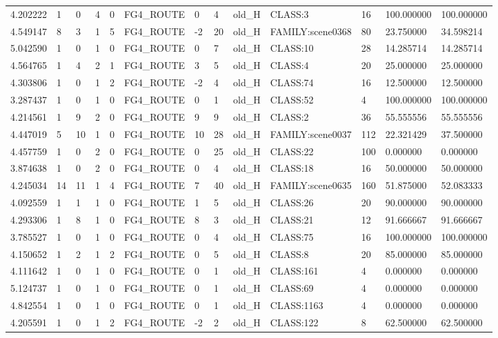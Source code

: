 \begin{tabular}{lllllllllllll}
4.202222 & 1 & 0 & 4 & 0 & FG4\_ROUTE & 0 & 4 & old\_H & CLASS:3 & 16 & 100.000000 & 100.000000 \\
4.549147 & 8 & 3 & 1 & 5 & FG4\_ROUTE & -2 & 20 & old\_H & FAMILY:scene0368 & 80 & 23.750000 & 34.598214 \\
5.042590 & 1 & 0 & 1 & 0 & FG4\_ROUTE & 0 & 7 & old\_H & CLASS:10 & 28 & 14.285714 & 14.285714 \\
4.564765 & 1 & 4 & 2 & 1 & FG4\_ROUTE & 3 & 5 & old\_H & CLASS:4 & 20 & 25.000000 & 25.000000 \\
4.303806 & 1 & 0 & 1 & 2 & FG4\_ROUTE & -2 & 4 & old\_H & CLASS:74 & 16 & 12.500000 & 12.500000 \\
3.287437 & 1 & 0 & 1 & 0 & FG4\_ROUTE & 0 & 1 & old\_H & CLASS:52 & 4 & 100.000000 & 100.000000 \\
4.214561 & 1 & 9 & 2 & 0 & FG4\_ROUTE & 9 & 9 & old\_H & CLASS:2 & 36 & 55.555556 & 55.555556 \\
4.447019 & 5 & 10 & 1 & 0 & FG4\_ROUTE & 10 & 28 & old\_H & FAMILY:scene0037 & 112 & 22.321429 & 37.500000 \\
4.457759 & 1 & 0 & 2 & 0 & FG4\_ROUTE & 0 & 25 & old\_H & CLASS:22 & 100 & 0.000000 & 0.000000 \\
3.874638 & 1 & 0 & 2 & 0 & FG4\_ROUTE & 0 & 4 & old\_H & CLASS:18 & 16 & 50.000000 & 50.000000 \\
4.245034 & 14 & 11 & 1 & 4 & FG4\_ROUTE & 7 & 40 & old\_H & FAMILY:scene0635 & 160 & 51.875000 & 52.083333 \\
4.092559 & 1 & 1 & 1 & 0 & FG4\_ROUTE & 1 & 5 & old\_H & CLASS:26 & 20 & 90.000000 & 90.000000 \\
4.293306 & 1 & 8 & 1 & 0 & FG4\_ROUTE & 8 & 3 & old\_H & CLASS:21 & 12 & 91.666667 & 91.666667 \\
3.785527 & 1 & 0 & 1 & 0 & FG4\_ROUTE & 0 & 4 & old\_H & CLASS:75 & 16 & 100.000000 & 100.000000 \\
4.150652 & 1 & 2 & 1 & 2 & FG4\_ROUTE & 0 & 5 & old\_H & CLASS:8 & 20 & 85.000000 & 85.000000 \\
4.111642 & 1 & 0 & 1 & 0 & FG4\_ROUTE & 0 & 1 & old\_H & CLASS:161 & 4 & 0.000000 & 0.000000 \\
5.124737 & 1 & 0 & 1 & 0 & FG4\_ROUTE & 0 & 1 & old\_H & CLASS:69 & 4 & 0.000000 & 0.000000 \\
4.842554 & 1 & 0 & 1 & 0 & FG4\_ROUTE & 0 & 1 & old\_H & CLASS:1163 & 4 & 0.000000 & 0.000000 \\
4.205591 & 1 & 0 & 1 & 2 & FG4\_ROUTE & -2 & 2 & old\_H & CLASS:122 & 8 & 62.500000 & 62.500000 \\

\end{tabular}
